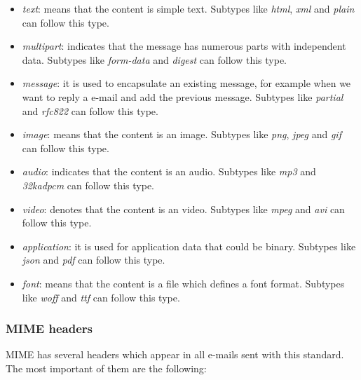 \begin{itemize}
	\item\textit{text}: means that the content is simple text. Subtypes like \textit{html}, \textit{xml} and \textit{plain} can follow this type.
	\item\textit{multipart}: indicates that the message has numerous parts with independent data. Subtypes like \textit{form-data} and \textit{digest} can follow this type.
	\item\textit{message}: it is used to encapsulate an existing message, for example when we want to reply a e-mail and add the previous message. Subtypes like \textit{partial} and \textit{rfc822} can follow this type.
	\item\textit{image}: means that the content is an image. Subtypes like \textit{png}, \textit{jpeg} and \textit{gif} can follow this type.
	\item\textit{audio}: indicates that the content is an audio. Subtypes like \textit{mp3} and \textit{32kadpcm} can follow this type.
	\item\textit{video}: denotes that the content is an video. Subtypes like \textit{mpeg} and \textit{avi} can follow this type.
	\item\textit{application}: it is used for application data that could be binary. Subtypes like \textit{json} and \textit{pdf} can follow this type.
	\item\textit{font}: means that the content is a file which defines a font format. Subtypes like \textit{woff} and \textit{ttf} can follow this type.
\end{itemize}

\subsubsection{MIME headers} \label{sssect:MIMEheaders}

MIME has several headers which appear in all e-mails sent with this standard. The most important of them are the following:

